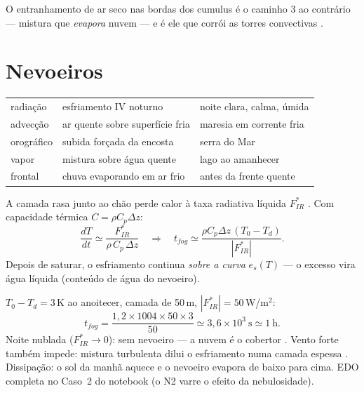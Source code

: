 \documentclass[11pt]{article}
\begin{document}
O entranhamento de ar seco nas bordas dos cumulus é o caminho 3 ao
contrário — mistura que \emph{evapora} nuvem — e é ele que corrói as
torres convectivas .

\section{Nevoeiros}\label{sec:fog}


\begin{noquadro}
\begin{tabular}{lll}
radiação & esfriamento IV noturno & noite clara, calma, úmida \\
advecção & ar quente sobre superfície fria & maresia em corrente fria \\
orográfico & subida forçada da encosta & serra do Mar \\
vapor & mistura sobre água quente & lago ao amanhecer \\
frontal & chuva evaporando em ar frio & antes da frente quente \\
\end{tabular}
\end{noquadro}

\begin{formalivro}
A camada rasa junto ao chão perde calor à taxa radiativa líquida
$F^*_{IR}$ . Com capacidade térmica
$C = \rho C_p \Delta z$:
\[ \frac{dT}{dt} \simeq \frac{F^*_{IR}}{\rho\,C_p\,\Delta z}
\quad\Longrightarrow\quad
t_{fog} \simeq \frac{\rho C_p \Delta z\,(T_0 - T_d)}{|F^*_{IR}|}. \]
Depois de saturar, o esfriamento continua \emph{sobre a curva}
$e_s(T)$ — o excesso vira água líquida (conteúdo de água do nevoeiro).
\end{formalivro}

\begin{exemplo}
$T_0 - T_d = 3$\,K ao anoitecer, camada de 50\,m,
$|F^*_{IR}| = 50$\,W/m$^2$:
\[ t_{fog} = \frac{1{,}2\times1004\times50\times3}{50}
 \simeq 3{,}6\times10^3\ \mathrm{s} \simeq 1\ \mathrm{h}. \]
Noite nublada ($F^*_{IR}\to0$): sem nevoeiro — a nuvem é o cobertor
. Vento forte também impede: mistura
turbulenta dilui o esfriamento numa camada espessa
. Dissipação: o sol da manhã aquece
e o nevoeiro evapora de baixo para cima. EDO completa no Caso~2 do
notebook (o N2 varre o efeito da nebulosidade).
\end{exemplo}
\end{document}
